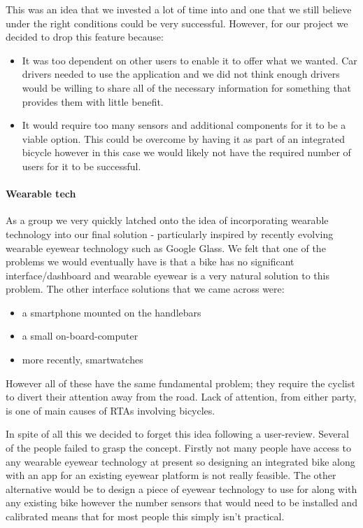 \documentclass[a4paper]{report}
\begin{document}
This was an idea that we invested a lot of time into and one that we still believe under the right conditions could be very successful. However, for our project we decided to drop this feature because:
\begin{itemize}
\item It was too dependent on other users to enable it to offer what we wanted. Car drivers needed to use the application and we did not think enough drivers would be willing to share all of the necessary information for something that provides them with little benefit.
\item It would require too many sensors and additional components for it to be a viable option. This could be overcome by having it as part of an integrated bicycle however in this case we would likely not have the required number of users for it to be successful.
\end{itemize}


\paragraph{Wearable tech}As a group we very quickly latched onto the idea of incorporating wearable technology into our final solution - particularly inspired by recently evolving wearable eyewear technology such as Google Glass. We felt that one of the problems we would eventually have is that a bike has no significant interface/dashboard and wearable eyewear is a very natural solution to this problem. The other interface solutions that we came across were: 
\begin{itemize}
  \item a smartphone mounted on the handlebars
  \item a small on-board-computer
  \item more recently, smartwatches
\end{itemize}
However all of these have the same fundamental problem; they require the cyclist to divert their attention away from the road. Lack of attention, from either party, is one of main causes of RTAs involving bicycles. %

In spite of all this we decided to forget this idea following a user-review. Several of the people failed to grasp the concept. Firstly not many people have access to any wearable eyewear technology at present so designing an integrated bike along with an app for an existing eyewear platform is not really feasible. The other alternative would be to design a piece of eyewear technology to use for along with any existing bike however the number sensors that would need to be installed and calibrated means that for most people this simply isn't practical.
\end{document}
